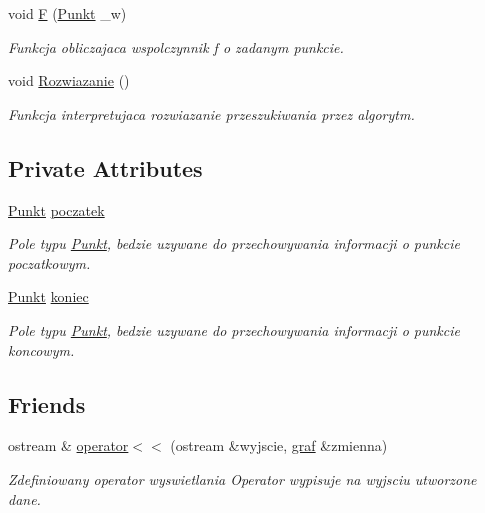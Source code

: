 \begin{DoxyCompactItemize}
void \hyperlink{classgraf_ab9f67baa527bf9599a51c3496141ffec}{F} (\hyperlink{struct_punkt}{Punkt} \-\_\-w)
\begin{DoxyCompactList}\small\item\em Funkcja obliczajaca wspolczynnik f o zadanym punkcie. \end{DoxyCompactList}\item 
void \hyperlink{classgraf_a83ed10e2edea60ec7b8082d65dae0562}{Rozwiazanie} ()
\begin{DoxyCompactList}\small\item\em Funkcja interpretujaca rozwiazanie przeszukiwania przez algorytm. \end{DoxyCompactList}\end{DoxyCompactItemize}
\subsection*{Private Attributes}
\begin{DoxyCompactItemize}
\item 
\hyperlink{struct_punkt}{Punkt} \hyperlink{classgraf_a9472ec2485e3ab3363425b57b23972ae}{poczatek}
\begin{DoxyCompactList}\small\item\em Pole typu \hyperlink{struct_punkt}{Punkt}, bedzie uzywane do przechowywania informacji o punkcie poczatkowym. \end{DoxyCompactList}\item 
\hyperlink{struct_punkt}{Punkt} \hyperlink{classgraf_a484fe30b7f50d38d39bcb44d6ec88748}{koniec}
\begin{DoxyCompactList}\small\item\em Pole typu \hyperlink{struct_punkt}{Punkt}, bedzie uzywane do przechowywania informacji o punkcie koncowym. \end{DoxyCompactList}\end{DoxyCompactItemize}
\subsection*{Friends}
\begin{DoxyCompactItemize}
\item 
ostream \& \hyperlink{classgraf_a38651f35b4f57fd757770fcc914d3023}{operator$<$$<$} (ostream \&wyjscie, \hyperlink{classgraf}{graf} \&zmienna)
\begin{DoxyCompactList}\small\item\em Zdefiniowany operator wyswietlania Operator wypisuje na wyjsciu utworzone dane. \end{DoxyCompactList}\end{DoxyCompactItemize}


